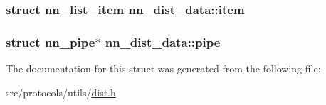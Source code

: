 \subsubsection[{item}]{\setlength{\rightskip}{0pt plus 5cm}struct {\bf nn\+\_\+list\+\_\+item} nn\+\_\+dist\+\_\+data\+::item}\hypertarget{structnn__dist__data_a32fb0eac783b93d2ba805656f1d9e6a6}{}\label{structnn__dist__data_a32fb0eac783b93d2ba805656f1d9e6a6}
\subsubsection[{pipe}]{\setlength{\rightskip}{0pt plus 5cm}struct nn\+\_\+pipe$\ast$ nn\+\_\+dist\+\_\+data\+::pipe}\hypertarget{structnn__dist__data_a812ff5953bd78545db17cdb09ba7cd48}{}\label{structnn__dist__data_a812ff5953bd78545db17cdb09ba7cd48}


The documentation for this struct was generated from the following file\+:\begin{DoxyCompactItemize}
\item 
src/protocols/utils/\hyperlink{dist_8h}{dist.\+h}\end{DoxyCompactItemize}
